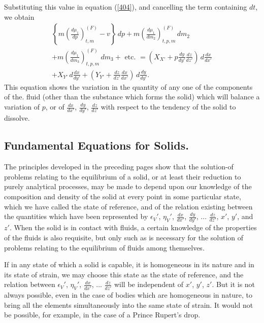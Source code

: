 \documentclass[12pt]{article}
\begin{document}
{Substituting this value in equation (\ref{404}), and cancelling the term containing $dt$, we obtain
\begin{multline}
\left\{m\left( \frac{d \mu_1}{dp}\right)_{t,m}^{(F)} -v \right\}\, dp + m \left( \frac{d \mu_1}{dm_2}\right)_{t,p,m}^{(F)} \, dm_2 \\
+ m \left( \frac{d \mu_1}{dm_3}\right)_{t,p,m}^{(F)} \, dm_3
+ \text{ etc. } = \left(X_{X'} +p \frac{dy}{dy'}\frac{dz}{dz'}\right)\,d\frac{dx}{dx'} \\
+ X_{Y'}\, d \frac{dx}{dy'} +\left(Y_{Y'} +\frac{dz}{dz'}\frac{dx}{dx'}\right)\, d \frac{dy}{dy'}. \label{411} \end{multline}
This equation shows the variation in the quantity of any one of the components of the. fluid (other than the substance which forms the
solid) which will balance a variation of $p$, or of $\frac{dx}{dx'}$, $\frac{dy}{dy'}$, $\frac{dz}{dz'}$ with respect to the tendency of the solid to dissolve.

\subsection{Fundamental Equations for Solids.}
The principles developed in the preceding pages show that the solution-of problems relating to the equilibrium of a solid, or at least their reduction to purely analytical processes, may be made to depend upon our knowledge of the composition and density of the solid at every point in some particular state, which we have called the state of reference, and of the relation existing between the quantities which have been represented by $\epsilon_V'$, $\eta_V'$, $\frac{dx}{dx'}$, $\frac{dy}{dy'}$, ...  $\frac{dz}{dz'}$, $x'$, $y'$, and $z'$. When the solid is in contact with fluids, a certain knowledge of the properties of the fluids is also requisite, but only such as is necessary for the solution of problems relating to the equilibrium of fluids among themselves.


If in any state of which a solid is capable, it is homogeneous in its nature and in its state of strain, we may choose this state as the state
of reference, and the relation between $\epsilon_V'$, $\eta_V'$, $\frac{dx}{dx'}$, ...  $\frac{dz}{dz'}$ will be
independent of $x'$, $y'$, $z'$. But it is not always possible, even in the case of bodies which are homogeneous in nature, to bring all the elements simultaneously into the same state of strain. It would not be possible, for example, in the case of a Prince Rupert's drop.


}
\end{document}

